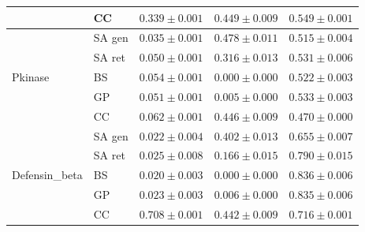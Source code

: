 \begin{table}[ht]
\begin{tabular}{@{}llccc@{}}
 & CC      & $0.339 \pm 0.001$ & $0.449 \pm 0.009$ & $0.549 \pm 0.001$ \\
\midrule
\multirow{5}{*}{Pkinase}
 & SA gen  & $\mathbf{0.035 \pm 0.001}$ & $\mathbf{0.478 \pm 0.011}$ & $0.515 \pm 0.004$ \\
 & SA ret  & $0.050 \pm 0.001$ & $0.316 \pm 0.013$ & $0.531 \pm 0.006$ \\
 & BS      & $0.054 \pm 0.001$ & $0.000 \pm 0.000$ & $0.522 \pm 0.003$ \\
 & GP      & $0.051 \pm 0.001$ & $0.005 \pm 0.000$ & $0.533 \pm 0.003$ \\
 & CC      & $0.062 \pm 0.001$ & $0.446 \pm 0.009$ & $\mathbf{0.470 \pm 0.000}$ \\
\midrule
\multirow{5}{*}{Defensin\_beta}
 & SA gen  & $\mathbf{0.022 \pm 0.004}$ & $\mathbf{0.402 \pm 0.013}$ & $\mathbf{0.655 \pm 0.007}$ \\
 & SA ret  & $0.025 \pm 0.008$ & $0.166 \pm 0.015$ & $0.790 \pm 0.015$ \\
 & BS      & $0.020 \pm 0.003$ & $0.000 \pm 0.000$ & $0.836 \pm 0.006$ \\
 & GP      & $0.023 \pm 0.003$ & $0.006 \pm 0.000$ & $0.835 \pm 0.006$ \\
 & CC      & $0.708 \pm 0.001$ & $0.442 \pm 0.009$ & $0.716 \pm 0.001$ \\
\bottomrule
\end{tabular}
\end{table}


